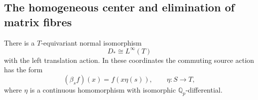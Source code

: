 \subsection{The homogeneous center and elimination of matrix fibres}

\begin{proposition}
\label{prop:finite-torsor}
There is a $T$-equivariant normal isomorphism
\[
 D_*\cong L^\infty(T)
\]
with the left translation action.  In these coordinates the
commuting source action has the form
\begin{equation}
 (\beta_s f)(x)=f(x\eta(s)),\qquad
 \eta:S\longrightarrow T,
 \label{eq:finite-right-action}
\end{equation}
where $\eta$ is a continuous homomorphism with isomorphic
$\mathbb Q_p$-differential.
\end{proposition}

